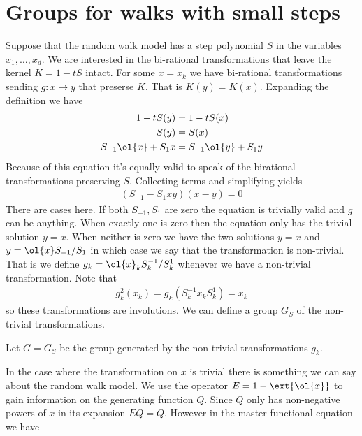 

\chapter{Groups for walks with small steps}

Suppose that the random walk model has a step polynomial $S$ in the variables $x_1,\ldots, x_d$. We are interested in the bi-rational transformations that leave the kernel $K = 1 - tS$ intact. For some $x = x_k$ we have bi-rational transformations sending $g: x \mapsto y$ that preserse $K$. That is $K(y) = K(x)$. Expanding the definition we have
\begin{align}
		1- tS(y) &= 1- tS(x)\\
		S(y) &= S(x)\\
		S_{-1}\ol{x} + S_1 x & = S_{-1} \ol{y} + S_1 y
\end{align}
Because of this equation it's equally valid to speak of the birational transformations preserving $S$. Collecting terms and simplifying yields
\begin{align}
	(S_{-1}-S_1 xy)(x-y) = 0
\end{align}
There are cases here. If both $S_{-1},S_1$ are zero the equation is trivially valid and $g$ can be anything. When exactly one is zero then the equation only has the trivial solution $y = x$. When neither is zero we have the two solutions $y= x$ and $y = \ol{x}S_{-1}/S_1$ in which case we say that the transformation is non-trivial. That is we define $g_k = \ol{x}_k S_k^{-1}/S_k^1$ whenever we have a non-trivial transformation. Note that
\begin{align}
	g_k^2(x_k) = g_k\left({S_k^{-1}}{x_kS_k^1}\right) = x_k
\end{align}
so these transformations are involutions. We can define a group $G_S$ of the non-trivial transformations.
\begin{definition} Let $G = G_S$ be the group generated by the non-trivial transformations $g_k$.
\end{definition}
In the case where the transformation on $x$ is trivial there is something we can say about the random walk model. We use the operator $E = 1 - \ext{\ol{x}}$ to gain information on the generating function $Q$. Since $Q$ only has non-negative powers of $x$ in its expansion $EQ = Q$. However in the master functional equation we have
